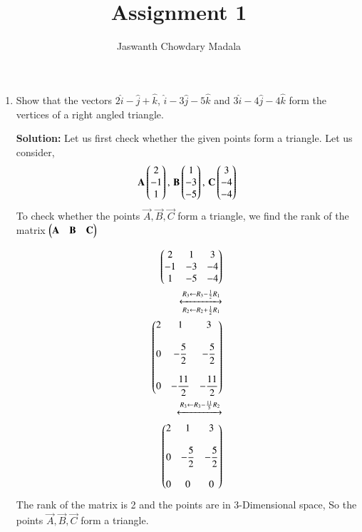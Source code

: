 \documentclass[journal,12pt,twocolumn]{IEEEtran}
\begin{document}
\vspace{3cm}


\title{Assignment 1}
\author{Jaswanth Chowdary Madala}





\maketitle

\newpage


\bigskip

\renewcommand{\thefigure}{\theenumi}
\renewcommand{\thetable}{\theenumi}


\begin{enumerate}

\item Show that the vectors $2\hat{i}-\hat{j}+\hat{k}$, $\hat{i}-3\hat{j}-5\hat{k}$ and $3\hat{i}-4\hat{j}-4\hat{k}$ form the vertices of a right angled triangle.

\textbf{Solution:} Let us first check whether the given points form a triangle. Let us consider, 
\begin{align}
\mathbf{A}\begin{pmatrix}2\\-1\\1\end{pmatrix}, \, \mathbf{B}\begin{pmatrix}1\\-3\\-5\end{pmatrix}, \, \mathbf{C}\begin{pmatrix}3\\-4\\-4\end{pmatrix} 
\end{align}
To check whether the points $\vec{A},\vec{B},\vec{C}$ form a triangle, we find the rank of the matrix $\begin{pmatrix}\mathbf{A}&\mathbf{B}&\mathbf{C}\end{pmatrix}$

\begin{align}
\begin{pmatrix}2&1&3\\-1&-3&-4\\1&-5&-4\end{pmatrix}\\
\xleftrightarrow [R_2 \leftarrow R_2+\frac{1}{2}R_1]{R_3 \leftarrow R_3-\frac{1}{2}R_1} \\
\begin{pmatrix}2&1&3\\ \\0&-\dfrac{5}{2}&-\dfrac{5}{2}\\\\0&-\dfrac{11}{2}&-\dfrac{11}{2}\end{pmatrix}\\
\xleftrightarrow[]{R_3 \leftarrow R_3-\frac{11}{5}R_2}\\
\begin{pmatrix}2&1&3\\ \\0&-\dfrac{5}{2}&-\dfrac{5}{2}\\\\0&0&0\end{pmatrix}
\end{align}
The rank of the matrix is 2 and the points are in 3-Dimensional space, So the points $\vec{A},\vec{B},\vec{C}$ form a triangle.\\


\end{enumerate}
\end{document}
